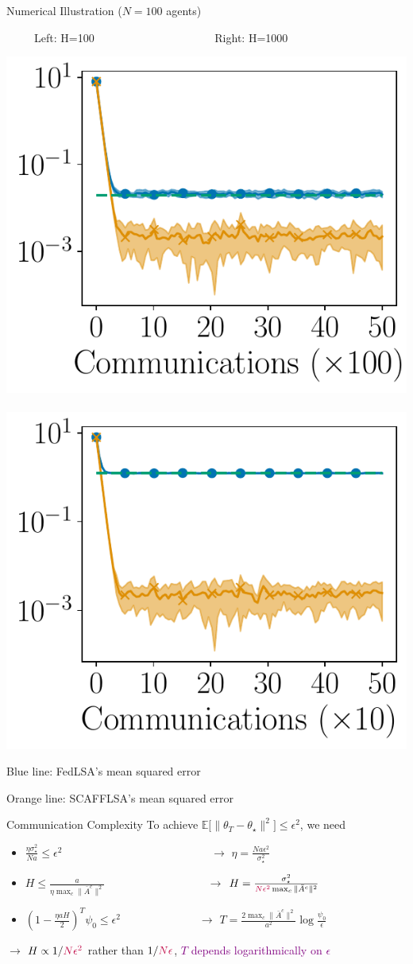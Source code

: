 \documentclass[aspectratio=169,14pt]{beamer}
\begin{document}
\begin{frame}{Numerical Illustration ($N=100$ agents)}
  \vspace{-0.5em}
  
  \begin{center}
    ~~~~~Left: H=100~~~~~~~~~~~~~~~~~~~~~
    Right: H=1000
 
    \vspace{-1em}
   
    \includegraphics[width=0.4\linewidth]{images/plot_hg_100_n100.pdf}
    ~~
    \includegraphics[width=0.4\linewidth]{images/plot_hg_1000_n100.pdf}
  \end{center}

  \vspace{-1em}

  Blue line: FedLSA's mean squared error

  \vspace{-1em}

  Orange line: SCAFFLSA's mean squared error
\end{frame}



\begin{frame}{Communication Complexity}
  To achieve $\mathbb{E} \Big[ \| {\theta_T - \theta_\star} \|^2 \Big] \le \epsilon^2$, we need
  \begin{itemize}
  \item $\frac{\eta \sigma_\star^2}{N a} \le \epsilon^2$ ~~~~~~\,~~~~~~~~~~~~~~~~~~~ $\rightarrow$ $\eta = \frac{N a \epsilon^2}{\sigma_\star^2}$
  \item $H \le \frac{a}{\eta \max_c \| \bar{A}^c \|^2}$ ~~~~~~~~~~~~~~~~~ $\rightarrow$ $H = \frac{ \sigma_\star^2 }{\textcolor{purple}{N \epsilon^2} \max_c \| \bar{A}^c \|^2}$
  \item $(1 - \frac{\eta a H}{2})^{T} \psi_0 \le \epsilon^2$ ~~~~~~~~~~~\,~~$\rightarrow$ $T = \frac{2 \max_c \| \bar{A}^c \|^2}{a^2} \log \tfrac{\psi_0}{ \epsilon }$
  \end{itemize}

  $\rightarrow$ $H \propto 1/\textcolor{purple}{N\epsilon^2}$ rather than $1/\textcolor{purple}{N\epsilon}$, \textcolor{purple}{$T$ depends logarithmically on $\epsilon$}


\end{frame}
\end{document}
